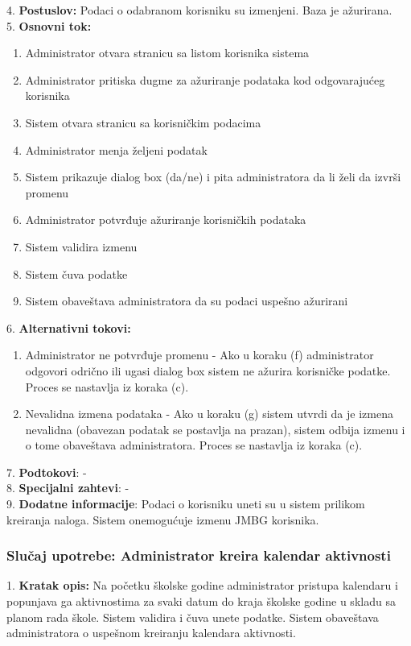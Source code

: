 \documentclass{article}
\begin{document}
4. \textbf{Postuslov:} Podaci o odabranom korisniku su izmenjeni. Baza je ažurirana. \\

5. \textbf{Osnovni tok:} 
\begin{enumerate} [label=(\alph*)]
\item Administrator otvara stranicu sa listom korisnika sistema
\item Administrator pritiska dugme za ažuriranje podataka kod odgovarajućeg korisnika
\item Sistem otvara stranicu sa korisničkim podacima
\item Administrator menja željeni podatak
\item Sistem prikazuje dialog box (da/ne) i pita administratora da li želi da izvrši promenu
\item Administrator potvrđuje ažuriranje korisničkih podataka
\item Sistem validira izmenu
\item Sistem čuva podatke
\item Sistem obaveštava administratora da su podaci uspešno ažurirani
\end{enumerate}

6. \textbf{Alternativni tokovi:}
\begin{enumerate} [label=(\roman*)]
    \item Administrator ne potvrđuje promenu - Ako u koraku (f) administrator odgovori odrično ili ugasi dialog box sistem ne ažurira korisničke podatke. Proces se nastavlja iz koraka (c).
    \item Nevalidna izmena podataka - Ako u koraku (g) sistem utvrdi da je izmena nevalidna (obavezan podatak se postavlja na prazan), sistem odbija izmenu i o tome obaveštava administratora. Proces se nastavlja iz koraka (c).
\end{enumerate}

7. \textbf{Podtokovi}: - \\

8. \textbf{Specijalni zahtevi}: - \\

9. \textbf{Dodatne informacije}: Podaci o korisniku uneti su u sistem prilikom kreiranja naloga. Sistem onemogućuje izmenu JMBG korisnika. \\

\subsubsection{Slučaj upotrebe: Administrator kreira kalendar aktivnosti}
1. \textbf{Kratak opis:} Na početku školske godine administrator pristupa kalendaru i popunjava ga aktivnostima za svaki datum do kraja školske godine u skladu sa planom rada škole. Sistem validira i čuva unete podatke. Sistem obaveštava administratora o uspešnom kreiranju kalendara aktivnosti. \\ 
\end{document}

